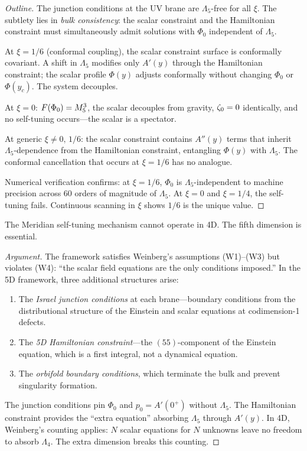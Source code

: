 \begin{proof}[Outline]
The junction conditions at the UV brane are $\Lambda_5$-free for all $\xi$. The subtlety lies in \emph{bulk consistency}: the scalar constraint and the Hamiltonian constraint must simultaneously admit solutions with $\Phi_0$ independent of $\Lambda_5$.

At $\xi = 1/6$ (conformal coupling), the scalar constraint surface is conformally covariant. A shift in $\Lambda_5$ modifies only $A'(y)$ through the Hamiltonian constraint; the scalar profile $\Phi(y)$ adjusts conformally without changing $\Phi_0$ or $\Phi(y_c)$. The system decouples.

At $\xi = 0$: $F(\Phi_0) = M_5^3$, the scalar decouples from gravity, $\zeta_0 = 0$ identically, and no self-tuning occurs---the scalar is a spectator.

At generic $\xi \neq 0,\,1/6$: the scalar constraint contains $A''(y)$ terms that inherit $\Lambda_5$-dependence from the Hamiltonian constraint, entangling $\Phi(y)$ with $\Lambda_5$. The conformal cancellation that occurs at $\xi = 1/6$ has no analogue.

Numerical verification confirms: at $\xi = 1/6$, $\Phi_0$ is $\Lambda_5$-independent to machine precision across 60 orders of magnitude of $\Lambda_5$. At $\xi = 0$ and $\xi = 1/4$, the self-tuning fails. Continuous scanning in $\xi$ shows $1/6$ is the unique value. \qedhere
\end{proof}

\begin{claim}
\label{thm:1-5D-necessity}
The Meridian self-tuning mechanism cannot operate in 4D. The fifth dimension is essential.
\end{claim}

\begin{proof}[Argument]
The framework satisfies Weinberg's assumptions (W1)--(W3) but violates (W4): ``the scalar field equations are the only conditions imposed.'' In the 5D framework, three additional structures arise:
\begin{enumerate}
\item The \emph{Israel junction conditions} at each brane---boundary conditions from the distributional structure of the Einstein and scalar equations at codimension-1 defects.
\item The \emph{5D Hamiltonian constraint}---the $(55)$-component of the Einstein equation, which is a first integral, not a dynamical equation.
\item The \emph{orbifold boundary conditions}, which terminate the bulk and prevent singularity formation.
\end{enumerate}
The junction conditions pin $\Phi_0$ and $p_0 = A'(0^+)$ without $\Lambda_5$. The Hamiltonian constraint provides the ``extra equation'' absorbing $\Lambda_5$ through $A'(y)$. In 4D, Weinberg's counting applies: $N$ scalar equations for $N$ unknowns leave no freedom to absorb $\Lambda_4$. The extra dimension breaks this counting. \qedhere
\end{proof}

